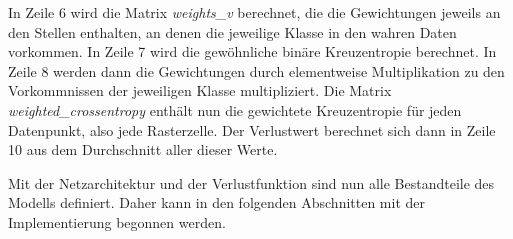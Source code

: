 In Zeile 6 wird die Matrix \emph{weights\_v} berechnet, die die Gewichtungen jeweils an den Stellen enthalten, an denen die jeweilige Klasse in den wahren Daten vorkommen.
In Zeile 7 wird die gewöhnliche binäre Kreuzentropie berechnet.
In Zeile 8 werden dann die Gewichtungen durch elementweise Multiplikation zu den Vorkommnissen der jeweiligen Klasse multipliziert.
Die Matrix \emph{weighted\_crossentropy} enthält nun die gewichtete Kreuzentropie für jeden Datenpunkt, also jede Rasterzelle.
Der Verlustwert berechnet sich dann in Zeile 10 aus dem Durchschnitt aller dieser Werte.

Mit der Netzarchitektur und der Verlustfunktion sind nun alle Bestandteile des Modells definiert.
Daher kann in den folgenden Abschnitten mit der Implementierung begonnen werden.
